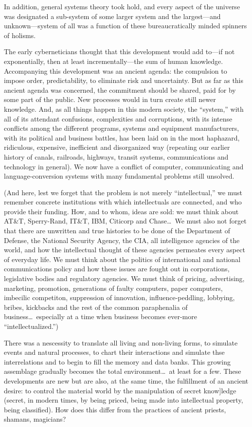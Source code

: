 In addition, general systems theory took hold, and every aspect of the universe was designated a
sub-system of some larger system and the largest---and unknown---system of all was a function of
these bureaucratically minded spinners of holisms. 

The early cyberneticians thought that this development would add to---if not exponentially, then at
least incrementally---the sum of human knowledge. Accompanying this development was an ancient
agenda: the compulsion to impose order, predictability, to eliminate risk and uncertainty. But as
far as this ancient agenda was concerned, the commitment should be shared, paid for by some part of
the public. New processes would in turn create still newer knowledge. And, as all things happen in
this modern society, the \enquote{system,} with all of its attendant confusions, complexities and
corruptions, with its intense conflicts among the different programs, systems and equipment
manufacturers, with its political and business battles, has been laid on in the most haphazard,
ridiculous, expensive, inefficient and disorganized way (repeating our earlier history of canals,
railroads, highways, transit systems, communications and technology in general). We now have a
conflict of computer, communicating and language-conversion systems with many fundamental problems
still unsolved. 


(And here, lest we forget that the problem is not merely \enquote{intellectual,} we must remember
concrete institutions with which intellectuals are connected, and who provide their funding. How,
and to whom, ideas are sold: we must think about AT\&T, Sperry-Rand, IT\&T, IBM, Citicorp and
Chase\ldots\ We must also not forget that there are unwritten and true histories to be done of the
Department of Defense, the National Security Agency, the CIA, all intelligence agencies of the
world, and how the intellectual thought of these agencies permeates every aspect of everyday life.
We must think about the politics of international and national communications policy and how these
issues are fought out in corporations, legislative bodies and regulatory agencies. We must think of
pricing, advertising, marketing, promotion, generations of faulty computers, paper computers,
imbecilic competiton, suppression of innovation, influence-peddling, lobbying, bribes, kickbacks and
the rest of the common paraphenalia of business\ldots\ especially at a time when business becomes
ever-more \enquote{intellectualized.}) 

There was a nescessity to translate all living and non-living forms, to simulate events and natural
processes, to chart their interactions and simulate thse interrelations and to begin to fill the
memory and data banks. This growing assemblage gradually becomes the total environment\ldots\ at least
for a few. These developments are new but are also, at the same time, the fulfillment of an ancient
desire: to control the material world by the manipulation of secret know]ledge (secret, in modern
times, by being priced, being made into intellectual property, being classified). How does this
differ from the practices of ancient priests, shamans, magicians? 

